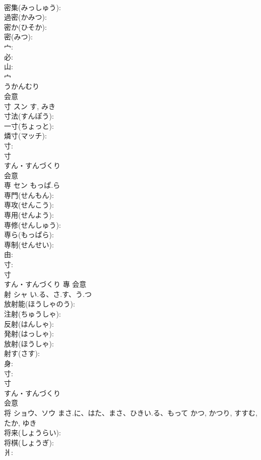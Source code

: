 \documentclass[8pt]{extreport}
\begin{document}
\begin{CJK}{UTF8}{min}
\\	密集(みっしゅう): 
\\	過密(かみつ): 
\\	密か(ひそか): 
\\	密(みつ): 
\\	宀: 
\\	必: 
\\	山: 
\\	宀	
\\	うかんむり	
\\	会意 
\\	寸	スン		す, みき	
\\	寸法(すんぽう): 
\\	一寸(ちょっと): 
\\	燐寸(マッチ): 
\\	寸: 
\\	寸	
\\	すん・すんづくり	
\\	会意 
\\	専	セン	もっぱ.ら		
\\	専門(せんもん): 
\\	専攻(せんこう): 
\\	専用(せんよう): 
\\	専修(せんしゅう): 
\\	専ら(もっぱら): 
\\	専制(せんせい): 
\\	由: 
\\	寸: 
\\	寸	
\\	すん・すんづくり	專	会意 
\\	射	シャ	い.る、さ.す、う.つ		
\\	放射能(ほうしゃのう): 
\\	注射(ちゅうしゃ): 
\\	反射(はんしゃ): 
\\	発射(はっしゃ): 
\\	放射(ほうしゃ): 
\\	射す(さす): 
\\	身: 
\\	寸: 
\\	寸	
\\	すん・すんづくり	
\\	会意 
\\	将	ショウ、ソウ	まさ.に、はた、まさ、ひきい.る、もって	かつ, かつり, すすむ, たか, ゆき	
\\	将来(しょうらい): 
\\	将棋(しょうぎ): 
\\	爿: 

\end{CJK}
\end{document}

